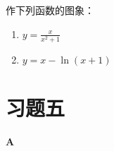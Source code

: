 \begin{ex}
作下列函数的图象：
\begin{multicols}{2}
\begin{enumerate}
    \item $y=\frac{x}{x^2+1}$
    \item $y=x-\ln(x+1)$
\end{enumerate}
\end{multicols}
\end{ex}



\section*{习题五}
\begin{center}
    \bfseries A
\end{center}

